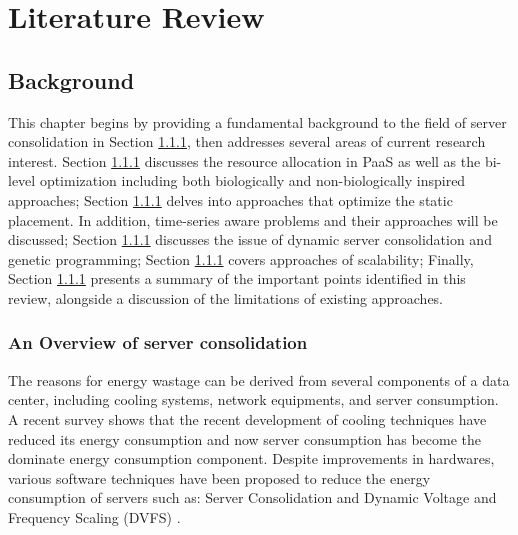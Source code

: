 \chapter{Literature Review}\label{C:background}
\section{Background}

This chapter begins by providing a fundamental background to the field of server consolidation in Section \ref{}, then addresses several areas of current research interest.
Section \ref{} discusses the resource allocation in PaaS as well as the bi-level optimization including both biologically and non-biologically
inspired approaches; Section \ref{} delves into approaches that optimize the static placement. In addition, time-series aware problems and their approaches will be discussed; Section \ref{} discusses the issue of dynamic server consolidation and genetic programming; Section \ref{} covers approaches of scalability; Finally, Section \ref{} presents a summary of the important points identified in this review, alongside a discussion of the limitations of existing approaches.

\subsection{An Overview of server consolidation}







The reasons for energy wastage can be derived from several components of a data center, including 
cooling systems, network equipments, and server consumption. 
A recent survey \cite{Cho:2016kz} shows that the recent development of cooling techniques 
have reduced its energy consumption and now 
server consumption has become the dominate energy consumption component.
Despite improvements in hardwares, various software techniques have been proposed 
to reduce the energy consumption of servers 
such as: Server Consolidation and Dynamic Voltage and Frequency Scaling (DVFS) \cite{}.

